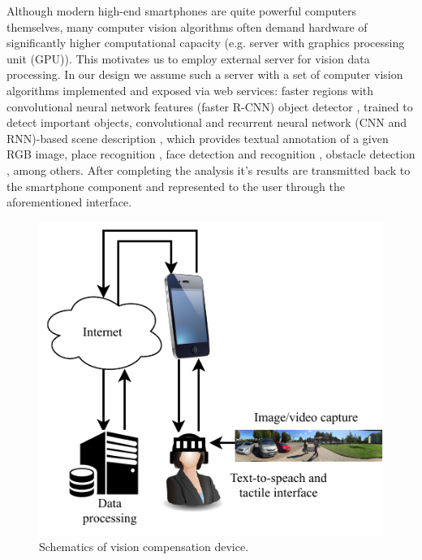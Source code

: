 \documentclass[10pt,conference,compsocconf]{IEEEtran}
\begin{document}
Although modern high-end smartphones are quite powerful computers themselves, many computer vision algorithms often demand hardware of significantly higher computational capacity (e.g. server with graphics processing unit (GPU)). This motivates us to employ external server for vision data processing. In our design we assume such a server with a set of computer vision algorithms implemented and exposed via web services: faster regions with convolutional neural network features (faster R-CNN) object detector \cite{Ren}, trained to detect important objects, convolutional and recurrent neural network (CNN and RNN)-based scene description \cite{Liu}, which provides textual annotation of a given RGB image, place recognition \cite{Ohn-Bar}, face detection and recognition \cite{Amos}, obstacle detection \cite{Laina}, among others. After completing the analysis it's results are transmitted back to the smartphone component and represented to the user through the aforementioned interface.



\begin{figure}
  \begin{center}
    \includegraphics[scale=1.0]{./img/cropped_diagram.pdf}  
  \end{center}
  \caption{Schematics of vision compensation device.}
  \label{fig:schematics}
\end{figure}
\end{document}
